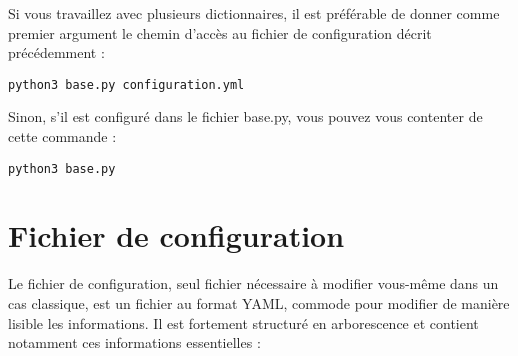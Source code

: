 \documentclass[10pt]{report}
\begin{document}
Si vous travaillez avec plusieurs dictionnaires, il est préférable de donner comme premier argument le chemin d’accès au fichier de configuration décrit précédemment :
\begin{verbatim}
python3 base.py configuration.yml
\end{verbatim}

Sinon, s’il est configuré dans le fichier base.py, vous pouvez vous contenter de cette commande :
\begin{verbatim}
python3 base.py
\end{verbatim}

\section{Fichier de configuration}

Le fichier de configuration, seul fichier nécessaire à modifier vous-même dans un cas classique, est un fichier au format YAML, commode pour modifier de manière lisible les informations. Il est fortement structuré en arborescence et contient notamment ces informations essentielles :
\end{document}
